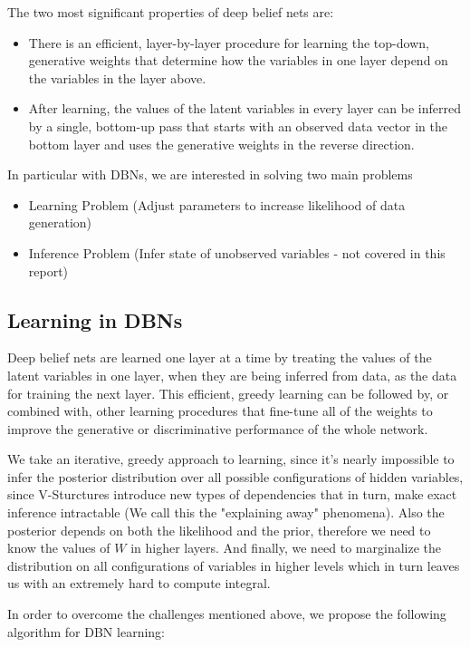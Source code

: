 \documentclass{article}
\begin{document}
The two most significant properties of deep belief nets are:

\begin{itemize}
    \item There is an efficient, layer-by-layer procedure for learning the top-down, generative weights that determine how the variables in one layer depend on the variables in the layer above.
    \item After learning, the values of the latent variables in every layer can be inferred by a single, bottom-up pass that starts with an observed data vector in the bottom layer and uses the generative weights in the reverse direction.
\end{itemize}

In particular with DBNs, we are interested in solving two main problems
\begin{itemize}
    \item Learning Problem (Adjust parameters to increase likelihood of data generation)
    \item Inference Problem (Infer state of unobserved variables - not covered in this report)
\end{itemize}

\subsection{Learning in DBNs}

Deep belief nets are learned one layer at a time by treating the values of the latent variables in one layer, when they are being inferred from data, as the data for training the next layer. This efficient, greedy learning can be followed by, or combined with, other learning procedures that fine-tune all of the weights to improve the generative or discriminative performance of the whole network. 

We take an iterative, greedy approach to learning, since it's nearly impossible to infer the posterior distribution over all possible configurations of hidden variables, since V-Sturctures introduce new types of dependencies that in turn, make exact inference intractable (We call this the "explaining away" phenomena). Also the posterior depends on both the likelihood and the prior, therefore we need to know the values of $W$ in higher layers. And finally, we need to marginalize the distribution on all configurations of variables in higher levels which in turn leaves us with an extremely hard to compute integral.

In order to overcome the challenges mentioned above, we propose the following algorithm for DBN learning:
\end{document}
